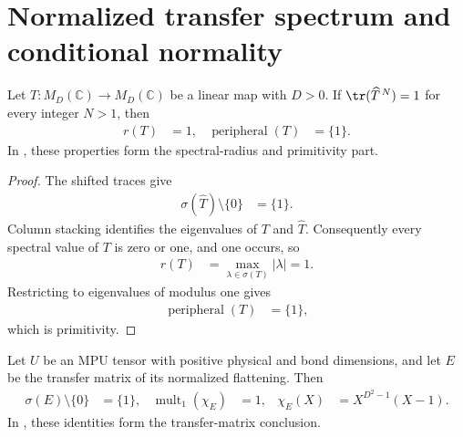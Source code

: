 \section{Normalized transfer spectrum and conditional normality}

\begin{lemma}
    \label{thm:mpu_shifted_transfer_trace_primitive}
    \leanok
    Let $T:M_D(\mathbb C)\to M_D(\mathbb C)$ be a linear map with $D>0$.
    If $\tr(\widehat T^{\,N})=1$ for every integer $N>1$, then
    \begin{align}
        r(T) & =1,
             & \operatorname{peripheral}(T) & =\{1\}.
    \end{align}
    In \cite[Proposition~III.1]{Cirac2017MPU}, these properties form the spectral-radius and primitivity
    part.
\end{lemma}

\begin{proof}\leanok
    The shifted traces give
    \begin{align}
        \sigma(\widehat T)\setminus\{0\} & =\{1\}.
    \end{align}
    Column stacking identifies the eigenvalues of $T$ and $\widehat T$.
    Consequently every spectral value of $T$ is zero or one, and one occurs,
    so
    \begin{align}
        r(T) & =\max_{\lambda\in\sigma(T)}|\lambda|=1.
    \end{align}
    Restricting to eigenvalues of modulus one gives
    \begin{align}
        \operatorname{peripheral}(T) & =\{1\},
    \end{align}
    which is primitivity.
\end{proof}

\begin{lemma}
    \label{thm:mpu_normalized_transfer_nonzero_spectrum}
    \leanok
    Let $U$ be an MPU tensor with positive physical and bond dimensions, and
    let $E$ be the transfer matrix of its normalized flattening. Then
    \begin{align}
        \sigma(E)\setminus\{0\} & =\{1\},
                                & \operatorname{mult}_{1}(\chi_E) & =1,
                                & \chi_E(X)                       & =X^{D^2-1}(X-1).
    \end{align}
    In \cite[Proposition~III.1]{Cirac2017MPU}, these identities form the transfer-matrix
    conclusion.
\end{lemma}

